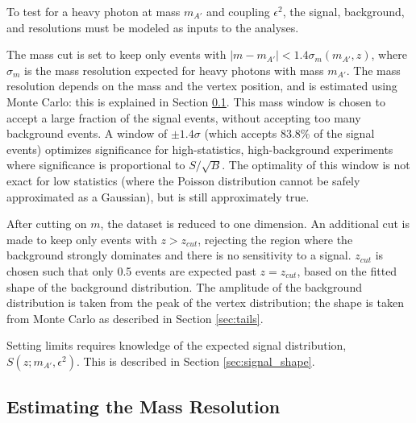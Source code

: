 
To test for a heavy photon at mass $m_{A'}$ and coupling $\epsilon^2$, the signal, background, and resolutions must be modeled as inputs to the analyses.

The mass cut is set to keep only events with $|m-m_{A'}|<1.4 \sigma_m(m_{A'},z)$, where $\sigma_m$ is the mass resolution expected for heavy photons with mass $m_{A'}$.
The mass resolution depends on the mass and the vertex position, and is estimated using Monte Carlo: this is explained in Section \ref{sec:mres}.
This mass window is chosen to accept a large fraction of the signal events, without accepting too many background events.
A window of $\pm1.4\sigma$ (which accepts 83.8\% of the signal events) optimizes significance for high-statistics, high-background experiments where significance is proportional to $S/\sqrt{B}$.
The optimality of this window is not exact for low statistics (where the Poisson distribution cannot be safely approximated as a Gaussian), but is still approximately true.

After cutting on $m$, the dataset is reduced to one dimension.
An additional cut is made to keep only events with $z>z_{cut}$, rejecting the region where the background strongly dominates and there is no sensitivity to a signal.
$z_{cut}$ is chosen such that only 0.5 events are expected past $z=z_{cut}$, based on the fitted shape of the background distribution.
The amplitude of the background distribution is taken from the peak of the vertex distribution; the shape is taken from Monte Carlo as described in Section \ref{sec:tails}.

Setting limits requires knowledge of the expected signal distribution, $S(z;m_{A'},\epsilon^2)$.
This is described in Section \ref{sec:signal_shape}.

\clearpage
\subsection{Estimating the Mass Resolution}
\label{sec:mres}

